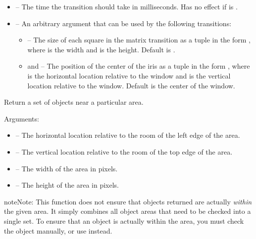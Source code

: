\documentclass[letterpaper,10pt,english]{sphinxmanual}
\begin{document}
\begin{fulllineitems}
\begin{itemize}
\item {} 
 -- The time the transition should take in
milliseconds.  Has no effect if  is
.

\item {} 
 -- An arbitrary argument that can be used
by the following transitions:
\begin{itemize}
\item {} 
 -- The size of each square in the matrix
transition as a tuple in the form , where  is
the width and  is the height.  Default is .

\item {} 
 and  -- The position of the
center of the iris as a tuple in the form , where
 is the horizontal location relative to the window and
 is the vertical location relative to the window.
Default is the center of the window.

\end{itemize}

\end{itemize}

\end{fulllineitems}


\begin{fulllineitems}
\label{dsp:sge.dsp.Room.get_objects_at}
Return a set of objects near a particular area.

Arguments:
\begin{itemize}
\item {} 
 -- The horizontal location relative to the room of the
left edge of the area.

\item {} 
 -- The vertical location relative to the room of the
top edge of the area.

\item {} 
 -- The width of the area in pixels.

\item {} 
 -- The height of the area in pixels.

\end{itemize}

\begin{notice}{note}{Note:}
This function does not ensure that objects returned are
actually \emph{within} the given area.  It simply combines all
object areas that need to be checked into a single set.  To
ensure that an object is actually within the area, you must
check the object manually, or use
{\hyperref[collision:sge.collision.rectangle]{\emph{}}} instead.
\end{notice}

\end{fulllineitems}
\end{document}
